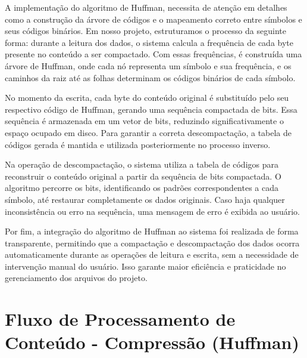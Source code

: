 \documentclass[12pt]{article}
\begin{document}
A implementação do algoritmo de Huffman, necessita de atenção em detalhes como a construção da árvore de códigos e o mapeamento correto entre símbolos e seus códigos binários. Em nosso projeto, estruturamos o processo da seguinte forma: durante a leitura dos dados, o sistema calcula a frequência de cada byte presente no conteúdo a ser compactado. Com essas frequências, é construída uma árvore de Huffman, onde cada nó representa um símbolo e sua frequência, e os caminhos da raiz até as folhas determinam os códigos binários de cada símbolo.

No momento da escrita, cada byte do conteúdo original é substituído pelo seu respectivo código de Huffman, gerando uma sequência compactada de bits. Essa sequência é armazenada em um vetor de bits, reduzindo significativamente o espaço ocupado em disco. Para garantir a correta descompactação, a tabela de códigos gerada é mantida e utilizada posteriormente no processo inverso.

Na operação de descompactação, o sistema utiliza a tabela de códigos para reconstruir o conteúdo original a partir da sequência de bits compactada. O algoritmo percorre os bits, identificando os padrões correspondentes a cada símbolo, até restaurar completamente os dados originais. Caso haja qualquer inconsistência ou erro na sequência, uma mensagem de erro é exibida ao usuário.

Por fim, a integração do algoritmo de Huffman ao sistema foi realizada de forma transparente, permitindo que a compactação e descompactação dos dados ocorra automaticamente durante as operações de leitura e escrita, sem a necessidade de intervenção manual do usuário. Isso garante maior eficiência e praticidade no gerenciamento dos arquivos do projeto.

\section*{Fluxo de Processamento de Conteúdo - Compressão (Huffman)} 
\begin{center} 
\end{center}
\end{document}
